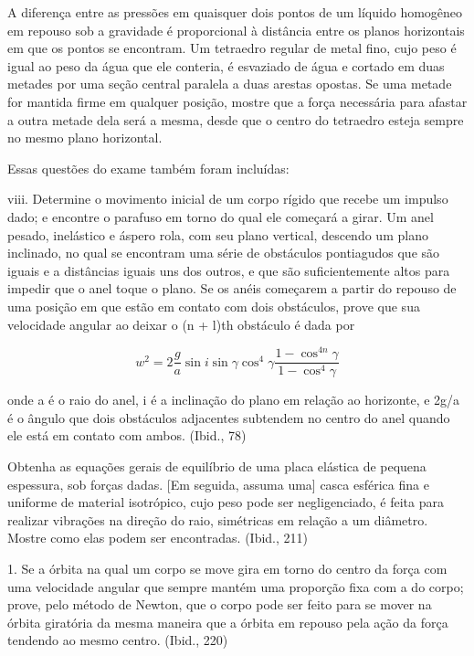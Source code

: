 \documentclass[a4paper,12pt]{article}[abntex2]
\begin{document}
A diferença entre as pressões em quaisquer dois pontos de um líquido homogêneo em repouso sob a gravidade é proporcional à distância entre os planos horizontais em que os pontos se encontram. Um tetraedro regular de metal fino, cujo peso é igual ao peso da água que ele conteria, é esvaziado de água e cortado em duas metades por uma seção central paralela a duas arestas opostas. Se uma metade for mantida firme em qualquer posição, mostre que a força necessária para afastar a outra metade dela será a mesma, desde que o centro do tetraedro esteja sempre no mesmo plano horizontal.

Essas questões do exame também foram incluídas:

viii. Determine o movimento inicial de um corpo rígido que recebe um impulso dado; e encontre o parafuso em torno do qual ele começará a girar. Um anel pesado, inelástico e áspero rola, com seu plano vertical, descendo um plano inclinado, no qual se encontram uma série de obstáculos pontiagudos que são iguais e a distâncias iguais uns dos outros, e que são suficientemente altos para impedir que o anel toque o plano. Se os anéis começarem a partir do repouso de uma posição em que estão em contato com dois obstáculos, prove que sua velocidade angular ao deixar o (n + l)th obstáculo é dada por

$$ w^2 = 2 \frac{g}{a} \sin i \sin \gamma \cos^4\gamma \frac{1 - \cos^{4n}\gamma}{1 - \cos^4\gamma}  $$

onde a é o raio do anel, i é a inclinação do plano em relação ao horizonte, e 2g/a é o ângulo que dois obstáculos adjacentes subtendem no centro do anel quando ele está em contato com ambos. (Ibid., 78)

Obtenha as equações gerais de equilíbrio de uma placa elástica de pequena espessura, sob forças dadas. [Em seguida, assuma uma] casca esférica fina e uniforme de material isotrópico, cujo peso pode ser negligenciado, é feita para realizar vibrações na direção do raio, simétricas em relação a um diâmetro. Mostre como elas podem ser encontradas. (Ibid., 211)

1. Se a órbita na qual um corpo se move gira em torno do centro da força com uma velocidade angular que sempre mantém uma proporção fixa com a do corpo; prove, pelo método de Newton, que o corpo pode ser feito para se mover na órbita giratória da mesma maneira que a órbita em repouso pela ação da força tendendo ao mesmo centro. (Ibid., 220)
\end{document}
